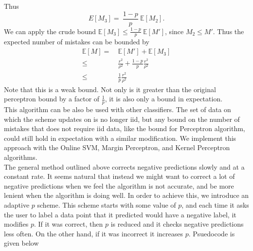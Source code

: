 \documentclass[12pt]{article}
\newcommand{\E}[0]{\mathbb{E}}
\begin{document}
Thus
\[
E[M_3] = \ \frac{1-p}{p}\ \E[M_2].
\]
We can apply the crude bound $\E[M_3] \leq \frac{1-p}{p}\ \E[M']$, since $M_2 \leq M'$. Thus the expected number of mistakes can be bounded by
\begin{align*}
\E[M]  =  &\ \E[M'] + \E[M_3] \\
\leq & \ \frac{r^2}{\rho^2} + \frac{1-p}{p}\frac{r^2}{\rho^2} \\
\leq  & \ \frac{1}{p}\frac{r^2}{\rho^2}
\end{align*}
Note that this is a weak bound.  Not only is it greater than the
original perceptron bound by a factor of $\frac{1}{p}$, it is also only a
bound in expectation.\\

This algorithm can be also be used with other classifiers.  The set of data on which the scheme updates on is no longer iid, but any bound on the number of mistakes that does not require iid data, like the bound for Perceptron algorithm, could still hold in expectation with a similar modification. We implement this approach with the Online SVM, Margin Perceptron, and Kernel Perceptron algorithms.  \\
The general method outlined above corrects negative predictions slowly and at a constant rate.  It seems natural that instead we might want to correct a lot of negative predictions when we feel the algorithm is not accurate, and be more lenient when the algorithm is doing well.  In order to achieve this, we introduce an adaptive $p$ scheme.  This scheme starts with some value of $p$, and each time it asks the user to label a data point that it predicted would have a negative label, it modifies $p$.  If it was correct, then $p$ is reduced and it checks negative predictions less often.  On the other hand, if it was incorrect it increases $p$. Psuedocode is given below \\
\end{document}
